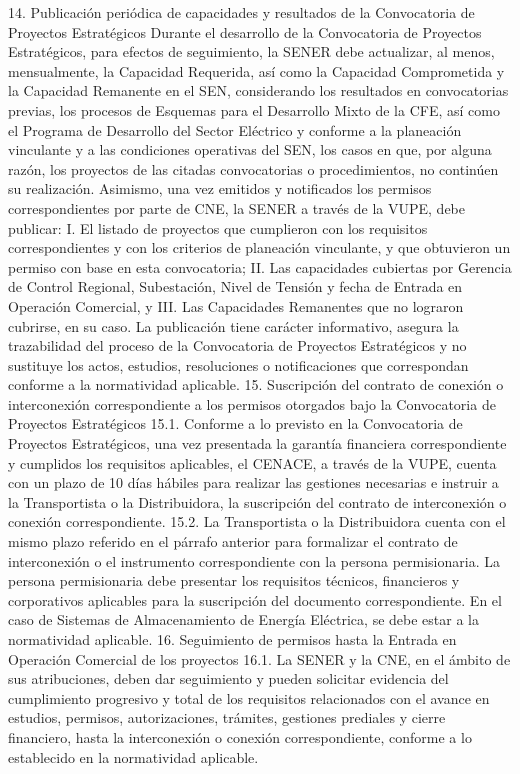 14. Publicación periódica de capacidades y resultados de la Convocatoria de Proyectos Estratégicos
Durante el desarrollo de la Convocatoria de Proyectos Estratégicos, para efectos de seguimiento, la SENER debe actualizar, al menos, mensualmente, la Capacidad Requerida, así como la Capacidad Comprometida y la Capacidad Remanente en el SEN, considerando los resultados en convocatorias previas, los procesos de Esquemas para el Desarrollo Mixto de la CFE, así como el Programa de Desarrollo del Sector Eléctrico y conforme a la planeación vinculante y a las condiciones operativas del SEN, los casos en que, por alguna razón, los proyectos de las citadas convocatorias o procedimientos, no continúen su realización.
Asimismo, una vez emitidos y notificados los permisos correspondientes por parte de CNE, la SENER a través de la VUPE, debe publicar:
I. El listado de proyectos que cumplieron con los requisitos correspondientes y con los criterios de planeación vinculante, y que obtuvieron un permiso con base en esta convocatoria;
II. Las capacidades cubiertas por Gerencia de Control Regional, Subestación, Nivel de Tensión y fecha de Entrada en Operación Comercial, y
III. Las Capacidades Remanentes que no lograron cubrirse, en su caso.
La publicación tiene carácter informativo, asegura la trazabilidad del proceso de la Convocatoria de Proyectos Estratégicos y no sustituye los actos, estudios, resoluciones o notificaciones que correspondan conforme a la normatividad aplicable.
15. Suscripción del contrato de conexión o interconexión correspondiente a los permisos otorgados bajo la Convocatoria de Proyectos Estratégicos
15.1. Conforme a lo previsto en la Convocatoria de Proyectos Estratégicos, una vez presentada la garantía financiera correspondiente y cumplidos los requisitos aplicables, el CENACE, a través de la VUPE, cuenta con un plazo de 10 días hábiles para realizar las gestiones necesarias e instruir a la Transportista o la Distribuidora, la suscripción del contrato de interconexión o conexión correspondiente.
15.2. La Transportista o la Distribuidora cuenta con el mismo plazo referido en el párrafo anterior para formalizar el contrato de interconexión o el instrumento correspondiente con la persona permisionaria. La persona permisionaria debe presentar los requisitos técnicos, financieros y corporativos aplicables para la suscripción del documento correspondiente. En el caso de Sistemas de Almacenamiento de Energía Eléctrica, se debe estar a la normatividad aplicable.
16. Seguimiento de permisos hasta la Entrada en Operación Comercial de los proyectos
16.1. La SENER y la CNE, en el ámbito de sus atribuciones, deben dar seguimiento y pueden solicitar evidencia del cumplimiento progresivo y total de los requisitos relacionados con el avance en estudios, permisos, autorizaciones, trámites, gestiones prediales y cierre financiero, hasta la interconexión o conexión correspondiente, conforme a lo establecido en la normatividad aplicable.
